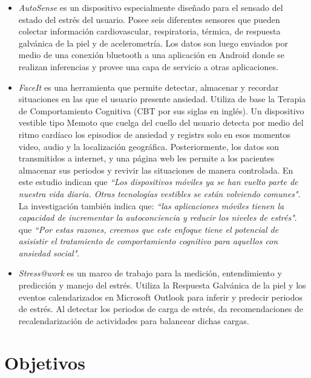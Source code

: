 \documentclass[letterpaper,12pt]{cicese}
\begin{document}
				\begin{itemize}
					\item{\emph{AutoSense}\citep{Ertin2011}} es un dispositivo especialmente dise\~nado para el sensado del estado del estr\'es del usuario. Posee seis diferentes
					sensores que pueden colectar informaci\'on cardiovascular, respiratoria, t\'ermica, de respuesta galv\'anica de la piel y de acelerometr\'ia. Los
					datos son luego enviados por medio de una conexi\'on bluetooth a una aplicaci\'on en Android donde se realizan inferencias y provee una capa de 
					servicio a otras aplicaciones.
		
					\item{\emph{FaceIt}\citep{Rennert2013}} es una herramienta que permite detectar, almacenar y recordar situaciones en las que el usuario presente ansiedad. Utiliza
					de base la Terapia de Comportamiento Cognitiva (CBT por sus siglas en ingl\'es). Un dispositivo vestible tipo Memoto que cuelga del cuello del usuario
					detecta por medio del ritmo card\'iaco los episodios de ansiedad y registrs solo en esos momentos video, audio y la localizaci\'on geogr\'afica. Posteriormente,
					los datos son transmitidos a internet, y una p\'agina web les permite a los pacientes almacenar sus periodos y revivir las situaciones de manera
					controlada. En este estudio indican que \emph{``Los dispositivos m\'oviles ya se han vuelto parte de nuestra vida diaria. Otras tecnolog\'ias vestibles 					se est\'an volviendo comunes"}. La investigaci\'on tambi\'en indica que: \emph{``las aplicaciones m\'oviles tienen la capacidad de incrementar
					la autoconciencia y reducir los niveles de estr\'es"}.  que \emph{``Por estas razones, creemos que este enfoque tiene el potencial de asisistir
					el tratamiento de comportamiento cognitivo para aquellos con ansiedad social"}.

					\item{\emph{Stress@work}\citep{Bakker2012SMS}} es un marco de trabajo para la medici\'on, entendimiento y predicci\'on y manejo del estr\'es. Utiliza la Respuesta
					Galv\'anica de la piel y los eventos calendarizados en Microsoft Outlook para inferir y predecir periodos de estr\'es. Al detectar los periodos de
					carga de estr\'es, da recomendaciones de recalendarizaci\'on de actividades para balancear dichas cargas.
				\end{itemize}
		\chapter{Objetivos}
\end{document}
